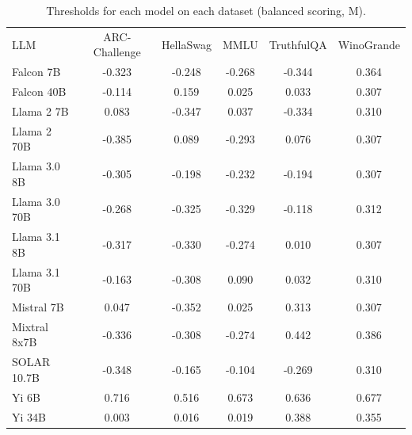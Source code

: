 \begin{table}[h]
\caption{Thresholds for each model on each dataset (balanced scoring, M). }
\label{tab:thresholds_prob_entropy_k20_w1}
\centering
\begin{tabular}{l S[table-format=3.1] S[table-format=3.1] S[table-format=3.1] S[table-format=3.1] S[table-format=3.1]}
\toprule
LLM & ARC-Challenge & HellaSwag & MMLU & TruthfulQA & WinoGrande \\ 
\cmidrule(lr){1-1} \cmidrule(lr){2-2} \cmidrule(lr){3-3} \cmidrule(lr){4-4} \cmidrule(lr){5-5} \cmidrule(lr){6-6}
Falcon 7B & -0.323 & -0.248 & -0.268 & -0.344 & 0.364\\
Falcon 40B & -0.114 & 0.159 & 0.025 & 0.033 & 0.307\\
Llama 2 7B & 0.083 & -0.347 & 0.037 & -0.334 & 0.310\\
Llama 2 70B & -0.385 & 0.089 & -0.293 & 0.076 & 0.307\\
Llama 3.0 8B & -0.305 & -0.198 & -0.232 & -0.194 & 0.307\\
Llama 3.0 70B & -0.268 & -0.325 & -0.329 & -0.118 & 0.312\\
Llama 3.1 8B & -0.317 & -0.330 & -0.274 & 0.010 & 0.307\\
Llama 3.1 70B & -0.163 & -0.308 & 0.090 & 0.032 & 0.310\\
Mistral 7B & 0.047 & -0.352 & 0.025 & 0.313 & 0.307\\
Mixtral 8x7B & -0.336 & -0.308 & -0.274 & 0.442 & 0.386\\
SOLAR 10.7B & -0.348 & -0.165 & -0.104 & -0.269 & 0.310\\
Yi 6B & 0.716 & 0.516 & 0.673 & 0.636 & 0.677\\
Yi 34B & 0.003 & 0.016 & 0.019 & 0.388 & 0.355\\
\bottomrule
\end{tabular}
\end{table}

